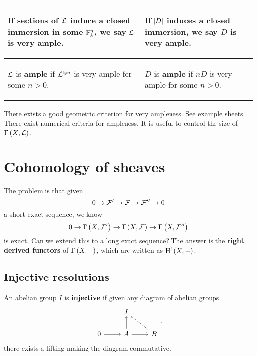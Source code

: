 \begin{center}
\begin{tabular}{p{}|p{}}
\hline
\begin{center} If sections of $ \mathcal{L} $ induce a closed immersion in some $ \mathbb{P}_k^n $, we say $ \mathcal{L} $ is \textbf{very ample}. \end{center} & \begin{center} If $ \abs{D} $ induces a closed immersion, we say $ D $ is \textbf{very ample}. \end{center} \\
\hline
\begin{center} $ \mathcal{L} $ is \textbf{ample} if $ \mathcal{L}^{\otimes n} $ is very ample for some $ n > 0 $. \end{center} & \begin{center} $ D $ is \textbf{ample} if $ nD $ is very ample for some $ n > 0 $. \end{center}
\end{tabular}
\end{center}

\begin{remark*}
There exists a good geometric criterion for very ampleness. See example sheets. There exist numerical criteria for ampleness. It is useful to control the size of $ \Gamma\br{X, \LLL} $.
\end{remark*}

\pagebreak

\section{Cohomology of sheaves}

The problem is that given
$$ 0 \to \mathcal{F}' \to \mathcal{F} \to \mathcal{F}'' \to 0 $$
a short exact sequence, we know
$$ 0 \to \Gamma\br{X, \FFF'} \to \Gamma\br{X, \FFF} \to \Gamma\br{X, \FFF''} $$
is exact. Can we extend this to a long exact sequence? The answer is the \textbf{right derived functors} of $ \Gamma\br{X, -} $, which are written as $ \H^i\br{X, -} $.

\subsection{Injective resolutions}


An abelian group $ I $ is \textbf{injective} if given any diagram of abelian groups
$$
\begin{tikzcd}
& I & \\
0 \arrow{r} & A \arrow{u} \arrow{r} & B \arrow[dashed]{ul}
\end{tikzcd},
$$
there exists a lifting making the diagram commutative.

